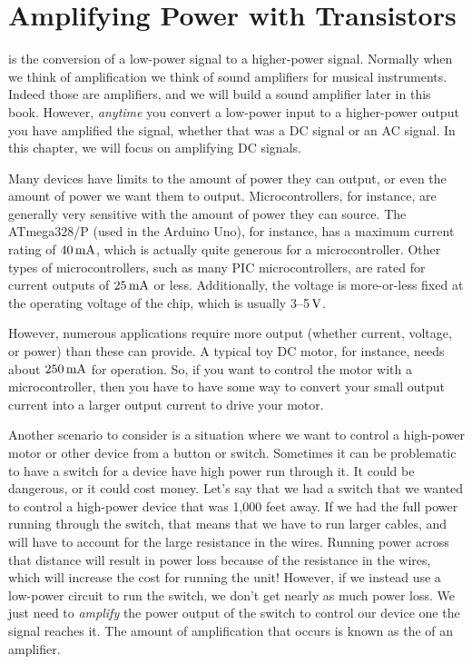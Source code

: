 \chapter{Amplifying Power with Transistors}
\label{chapTransistorIntro}

 is the conversion of a low-power signal to a higher-power signal.
Normally when we think of amplification we think of sound amplifiers for musical instruments.
Indeed those are amplifiers, and we will build a sound amplifier later in this book.
However, \emph{anytime} you convert a low-power input to a higher-power output you have amplified the signal, whether that was a DC signal or an AC signal.
In this chapter, we will focus on amplifying DC signals.

Many devices have limits to the amount of power they can output, or even the amount of power we want them to output.
Microcontrollers, for instance, are generally very sensitive with the amount of power they can source.
The ATmega328/P (used in the Arduino Uno), for instance, has a maximum current rating of $40\,\si{\milli\ampere}$, which is actually quite generous for a microcontroller.  
Other types of microcontrollers, such as many PIC microcontrollers, are rated for current outputs of $25\,\si{\milli\ampere}$ or less.
Additionally, the voltage is more-or-less fixed at the operating voltage of the chip, which is usually 3--5$\,\si{\volt}$.

However, numerous applications require more output (whether current, voltage, or power) than these can provide.
A typical toy DC motor, for instance, needs about $250\,\si{\milli\ampere}$ for operation.
So, if you want to control the motor with a microcontroller, then you have to have some way to convert your small output current into a larger output current to drive your motor.

Another scenario to consider is a situation where we want to control a high-power motor or other device from a button or switch.
Sometimes it can be problematic to have a switch for a device have high power run through it.
It could be dangerous, or it could cost money. 
Let's say that we had a switch that we wanted to control a high-power device that was 1,000 feet away.
If we had the full power running through the switch, that means that we have to run larger cables, and will have to account for the large resistance in the wires.
Running power across that distance will result in power loss because of the resistance in the wires, which will increase the cost for running the unit!
However, if we instead use a low-power circuit to run the switch, we don't get nearly as much power loss.
We just need to \emph{amplify} the power output of the switch to control our device one the signal reaches it.
The amount of amplification that occurs is known as the  of an amplifier.

